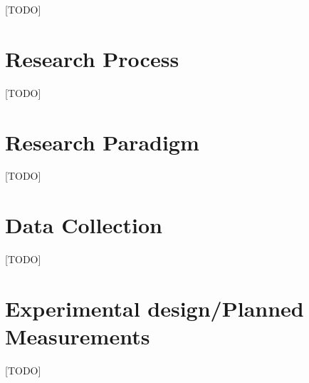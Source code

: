 [TODO]

\section{Research Process} \label{sec:researchProcess}
[TODO]

\section{Research Paradigm} \label{sec:researchParadigm}
[TODO]

\section{Data Collection} \label{sec:dataCollection}
[TODO]

\section{Experimental design/Planned Measurements} \label{sec:experimentalDesign}
[TODO]

